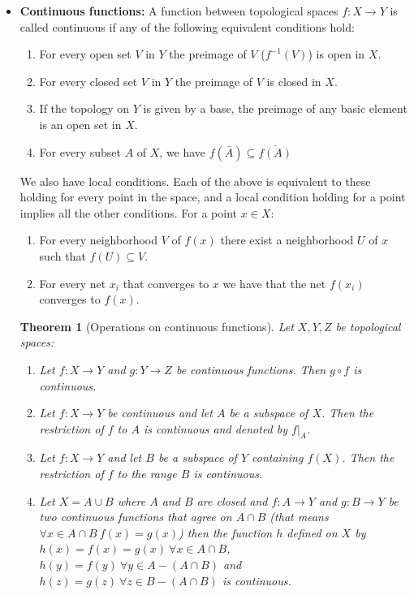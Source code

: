 \documentclass[a4paper]{article}
\newtheorem{theorem}{Theorem}[section]
\begin{document}
\begin{itemize}
\item
\textbf{Continuous functions: }A function between topological spaces $f:X\rightarrow Y$ is called continuous if any of the following equivalent conditions hold:
\begin{enumerate}
\item
For every open set $V$ in $Y$ the preimage of $V$ ($f^{-1}(V)$) is open in $X$.
\item
For every closed set $V$ in $Y$ the preimage of $V$ is closed in $X$.
\item
If the topology on $Y$ is given by a base, the preimage of any basic element is an open set in $X$.
\item
For every subset $A$ of $X$, we have $f(\bar{A})\subseteq \overline{f(A)}$
\end{enumerate}
We also have local conditions. Each of the above is equivalent to these holding for every point in the space, and a local condition holding for a point implies all the other conditions. For a point $x\in X$:
\begin{enumerate}
\item
For every neighborhood $V$ of $f(x)$ there exist a neighborhood $U$ of $x$ such that $f(U)\subseteq V$.
\item
For every net $x_{i}$ that converges to $x$ we have that the net $f(x_{i})$ converges to $f(x)$.
\end{enumerate}

\begin{theorem}[Operations on continuous functions]
Let $X,Y,Z$ be topological spaces:
\begin{enumerate}
\item
Let $f:X\rightarrow Y$ and $g:Y\rightarrow Z$ be continuous functions. Then $g\circ f$ is continuous.
\item
Let $f:X\rightarrow Y$ be continuous and let $A$ be a subspace of $X$. Then the restriction of $f$ to $A$ is continuous and denoted by $f|_{A}$.
\item
Let $f:X\rightarrow Y$ and let $B$ be a subspace of $Y$ containing $f(X)$. Then the restriction of $f$ to the range $B$ is continuous.
\item
Let $X=A\cup B$ where $A$ and $B$ are closed and $f:A\rightarrow Y$ and $g:B\rightarrow Y$ be two continuous functions that agree on $A\cap B$ (that means $\forall x \in A\cap B\ f(x)=g(x)$) then the function $h$ defined on $X$ by $h(x)=f(x)=g(x)\ \forall x \in A\cap B$, $h(y)=f(y)\ \forall y \in A-(A\cap B)$ and $h(z)=g(z)\ \forall z \in B-(A\cap B)$ is continuous.
\end{enumerate}
\end{theorem}


\end{itemize}
\end{document}
